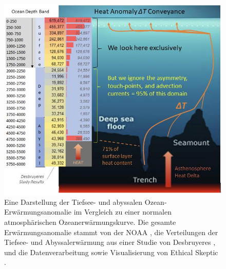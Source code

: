 \documentclass[10pt,twocolumn,letterpaper]{article}
\begin{document}
\begin{figure}[t]
\begin{center}
\includegraphics[width=1\textwidth]{deepsea.jpg}
\end{center}
   \caption{Eine Darstellung der Tiefsee- und abyssalen Ozean-Erwärmungsanomalie im Vergleich zu einer normalen atmosphärischen Ozeanerwärmungskurve. Die gesamte Erwärmungsanomalie stammt von der NOAA \cite{147}, die Verteilungen der Tiefsee- und Abyssalerwärmung aus einer Studie von Desbruyeres \cite{132}, und die Datenverarbeitung sowie Visualisierung von Ethical Skeptic \cite{129}.}
\label{fig:21}
\end{figure}
\end{document}
